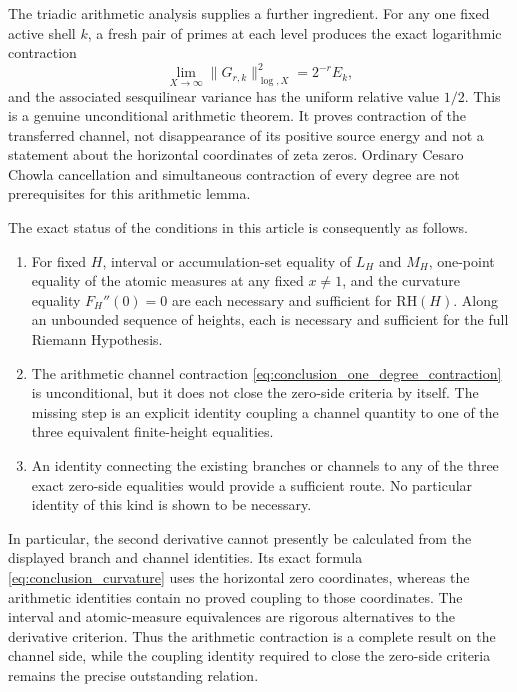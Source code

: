 \documentclass[11pt]{amsart}
\numberwithin{equation}{section}
\theoremstyle{plain}
\theoremstyle{definition}
\theoremstyle{remark}
\newcommand{\RH}{\mathrm{RH}}
\begin{document}
The triadic arithmetic analysis supplies a further ingredient.  For any one fixed active shell $k$, a fresh pair of primes at each level produces the exact logarithmic contraction
\begin{equation}
\lim_{X\to\infty}\|G_{r,k}\|_{\log,X}^2=2^{-r}E_k,
\label{eq:conclusion_one_degree_contraction}
\end{equation}
and the associated sesquilinear variance has the uniform relative value $1/2$.  This is a genuine unconditional arithmetic theorem.  It proves contraction of the transferred channel, not disappearance of its positive source energy and not a statement about the horizontal coordinates of zeta zeros.  Ordinary Cesaro Chowla cancellation and simultaneous contraction of every degree are not prerequisites for this arithmetic lemma.

The exact status of the conditions in this article is consequently as follows.
\begin{enumerate}[label=\textup{(\arabic*)}]
\item For fixed $H$, interval or accumulation-set equality of $L_H$ and $M_H$, one-point equality of the atomic measures at any fixed $x\neq1$, and the curvature equality $F_H''(0)=0$ are each necessary and sufficient for $\RH(H)$.  Along an unbounded sequence of heights, each is necessary and sufficient for the full Riemann Hypothesis.
\item The arithmetic channel contraction \eqref{eq:conclusion_one_degree_contraction} is unconditional, but it does not close the zero-side criteria by itself.  The missing step is an explicit identity coupling a channel quantity to one of the three equivalent finite-height equalities.
\item An identity connecting the existing branches or channels to any of the three exact zero-side equalities would provide a sufficient route.  No particular identity of this kind is shown to be necessary.
\end{enumerate}

In particular, the second derivative cannot presently be calculated from the displayed branch and channel identities.  Its exact formula \eqref{eq:conclusion_curvature} uses the horizontal zero coordinates, whereas the arithmetic identities contain no proved coupling to those coordinates.  The interval and atomic-measure equivalences are rigorous alternatives to the derivative criterion.  Thus the arithmetic contraction is a complete result on the channel side, while the coupling identity required to close the zero-side criteria remains the precise outstanding relation.
\end{document}
